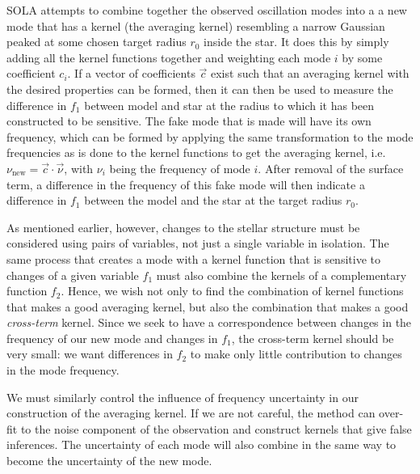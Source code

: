 \documentclass[twocolumn,twocolappendix]{aastex6}
\begin{document}
SOLA attempts to combine together the observed oscillation modes into a a new mode that has a kernel (the averaging kernel) resembling a narrow Gaussian peaked at some chosen target radius $r_0$ inside the star. 
It does this by simply adding all the kernel functions together and weighting each mode $i$ by some coefficient $c_i$. 
If a vector of coefficients $\vec c$ exist such that an averaging kernel with the desired properties can be formed, then it can then be used to measure the difference in $f_1$ between model and star at the radius to which it has been constructed to be sensitive. 
The fake mode that is made will have its own frequency, which can be formed by applying the same transformation to the mode frequencies as is done to the kernel functions to get the averaging kernel, i.e.~$\nu_\text{new} = \vec c \cdot \vec \nu$, with $\nu_i$ being the frequency of mode $i$. 
After removal of the surface term, a difference in the frequency of this fake mode will then indicate a difference in $f_1$ between the model and the star at the target radius $r_0$. 

As mentioned earlier, however, changes to the stellar structure must be considered using pairs of variables, not just a single variable in isolation. 
The same process that creates a mode with a kernel function that is sensitive to changes of a given variable $f_1$ must also combine the kernels of a complementary function $f_2$. 
Hence, we wish not only to find the combination of kernel functions that makes a good averaging kernel, but also the combination that makes a good \emph{cross-term} kernel. 
Since we seek to have a correspondence between changes in the frequency of our new mode and changes in $f_1$, the cross-term kernel should be very small: we want differences in $f_2$ to make only little contribution to changes in the mode frequency. 

We must similarly control the influence of frequency uncertainty in our construction of the averaging kernel. 
If we are not careful, the method can over-fit to the noise component of the observation and construct kernels that give false inferences. 
The uncertainty of each mode will also combine in the same way to become the uncertainty of the new mode. 
\end{document}
